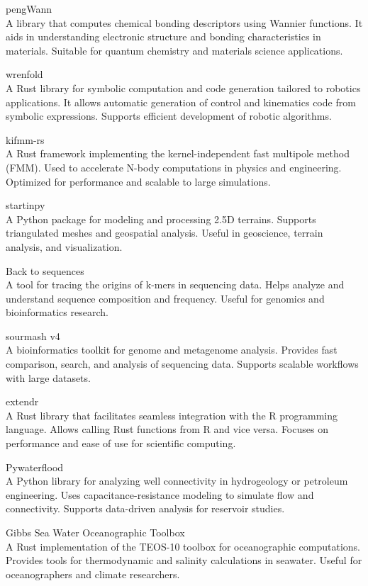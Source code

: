 \documentclass{article}
\begin{document}
pengWann\\
A library that computes chemical bonding descriptors using Wannier functions. It aids in
understanding electronic structure and bonding characteristics in materials. Suitable for quantum
chemistry and materials science applications.

wrenfold\\
A Rust library for symbolic computation and code generation tailored to robotics
applications. It allows automatic generation of control and kinematics code from symbolic
expressions. Supports efficient development of robotic algorithms.

kifmm-rs\\
A Rust framework implementing the kernel-independent fast multipole method (FMM). Used
to accelerate N-body computations in physics and engineering. Optimized for performance and
scalable to large simulations.

startinpy\\
A Python package for modeling and processing 2.5D terrains. Supports triangulated
meshes and geospatial analysis. Useful in geoscience, terrain analysis, and visualization.

Back to sequences\\
A tool for tracing the origins of k-mers in sequencing data. Helps analyze and
understand sequence composition and frequency. Useful for genomics and bioinformatics research.

sourmash v4\\
A bioinformatics toolkit for genome and metagenome analysis. Provides fast
comparison, search, and analysis of sequencing data. Supports scalable workflows with large
datasets.

extendr\\
A Rust library that facilitates seamless integration with the R programming language.
Allows calling Rust functions from R and vice versa. Focuses on performance and ease of use for
scientific computing.

Pywaterflood\\
A Python library for analyzing well connectivity in hydrogeology or petroleum
engineering. Uses capacitance-resistance modeling to simulate flow and connectivity. Supports
data-driven analysis for reservoir studies.

Gibbs Sea Water Oceanographic Toolbox\\
A Rust implementation of the TEOS-10 toolbox for
oceanographic computations. Provides tools for thermodynamic and salinity calculations in seawater.
Useful for oceanographers and climate researchers.
\end{document}

